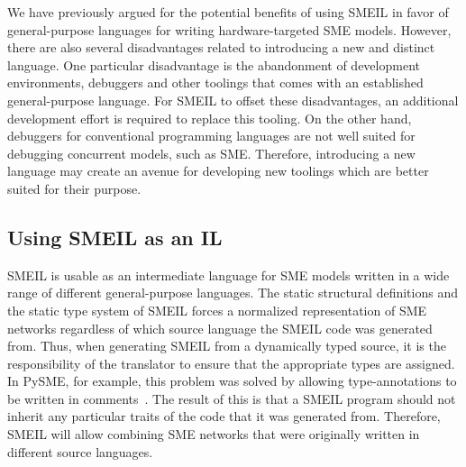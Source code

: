 

We have previously argued for the potential benefits of using SMEIL in favor of
general-purpose languages for writing hardware-targeted SME models. However,
there are also several disadvantages related to introducing a new and distinct
language. One particular disadvantage is the abandonment of development
environments, debuggers and other toolings that comes with an established
general-purpose language. For SMEIL to offset these disadvantages, an additional
development effort is required to replace this tooling. On the other hand,
debuggers for conventional programming languages are not well suited for
debugging concurrent models, such as SME. Therefore, introducing a new language
may create an avenue for developing new toolings which are better suited for
their purpose.





\subsection{Using SMEIL as an IL}
SMEIL is usable as an intermediate language for SME models written in a wide
range of different general-purpose languages. The static structural definitions
and the static type system of SMEIL forces a normalized representation of SME
networks regardless of which source language the SMEIL code was generated
from. Thus, when generating SMEIL from a dynamically typed source, it is the
responsibility of the translator to ensure that the appropriate types are
assigned. In PySME, for example, this problem was solved by allowing
type-annotations to be written in comments~\cite{asheim2016vhdl}. The result of
this is that a SMEIL program should not inherit any particular traits of the
code that it was generated from. Therefore, SMEIL will allow combining SME
networks that were originally written in different source languages.

